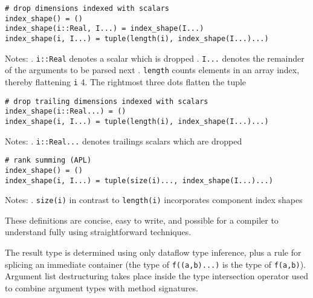 \documentclass[preprint]{sigplanconf}
\begin{document}
{\small
\begin{verbatim}
# drop dimensions indexed with scalars
index_shape() = ()
index_shape(i::Real, I...) = index_shape(I...)
index_shape(i, I...) = tuple(length(i), index_shape(I...)...)
\end{verbatim}
}

\noindent Notes: . \verb+i::Real+ denotes a scalar which is dropped . \verb+I...+ denotes the remainder of the arguments to be parsed next . \verb+length+ counts  elements in an array index, thereby flattening \verb+i+
4. The rightmost three dots flatten the tuple


{\small
\begin{verbatim}
# drop trailing dimensions indexed with scalars
index_shape(i::Real...) = ()
index_shape(i, I...) = tuple(length(i), index_shape(I...)...)
\end{verbatim}
}

\noindent Notes: . \verb+i::Real...+ denotes trailings scalars  which are dropped \newline


{\small
\begin{verbatim}
# rank summing (APL)
index_shape() = ()
index_shape(i, I...) = tuple(size(i)..., index_shape(I...)...)
\end{verbatim}
}


\noindent Notes: . \verb+size(i)+ in contrast to \verb+length(i)+ incorporates component index shapes \newline

These definitions are concise, easy to write, and possible for a compiler to
understand fully using straightforward techniques.


The result type is determined using only dataflow type inference, plus a rule
for splicing an immediate container (the type of \texttt{f((a,b)...)} is the
type of \texttt{f(a,b)}). Argument list destructuring takes place inside the
type intersection operator used to combine argument types with method
signatures.
\end{document}
